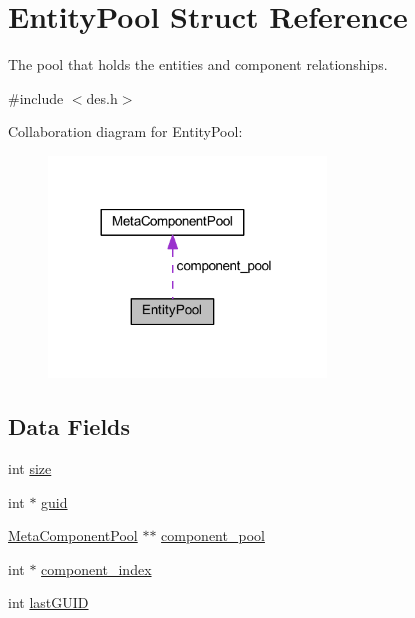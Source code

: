 \hypertarget{struct_entity_pool}{}\section{Entity\+Pool Struct Reference}
\label{struct_entity_pool}


The pool that holds the entities and component relationships.  




{\ttfamily \#include $<$des.\+h$>$}



Collaboration diagram for Entity\+Pool\+:\nopagebreak
\begin{figure}[H]
\begin{center}
\leavevmode
\includegraphics[width=209pt]{struct_entity_pool__coll__graph}
\end{center}
\end{figure}
\subsection*{Data Fields}
\begin{DoxyCompactItemize}
\item 
int \mbox{\hyperlink{struct_entity_pool_a439227feff9d7f55384e8780cfc2eb82}{size}}
\item 
int $\ast$ \mbox{\hyperlink{struct_entity_pool_a7ce754a177a158c41e7eae14122a3603}{guid}}
\item 
\mbox{\hyperlink{struct_meta_component_pool}{Meta\+Component\+Pool}} $\ast$$\ast$ \mbox{\hyperlink{struct_entity_pool_a9eecab6811f2cbb7343d9638605cc74d}{component\+\_\+pool}}
\item 
int $\ast$ \mbox{\hyperlink{struct_entity_pool_a2de99c265dcc7ac0f0fa20efeec9516f}{component\+\_\+index}}
\item 
int \mbox{\hyperlink{struct_entity_pool_aefadcdd88d2e6364fd584f35c374d324}{last\+G\+U\+ID}}
\end{DoxyCompactItemize}


